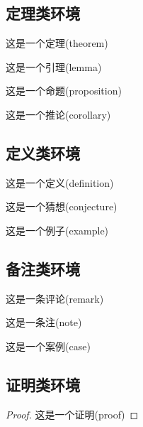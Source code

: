 \documentclass[cn,hazy,blue,11pt,device=normal,chinesefont=founder]{elegantnote}
\begin{document}
\subsection{定理类环境}

\begin{theorem}[名称]
  这是一个定理(theorem)
\end{theorem}

\begin{lemma}[名称]
  这是一个引理(lemma)
\end{lemma}

\begin{proposition}[名称]
  这是一个命题(proposition)
\end{proposition}

\begin{corollary}[名称]
  这是一个推论(corollary)
\end{corollary}

\subsection{定义类环境}

\begin{definition}[名称]
  这是一个定义(definition)
\end{definition}

\begin{conjecture}[名称]
  这是一个猜想(conjecture)
\end{conjecture}

\begin{example}[名称]
  这是一个例子(example)
\end{example}

\subsection{备注类环境}

\begin{remark}[名称]
  这是一条评论(remark)
\end{remark}

\begin{note}[名称]
  这是一条注(note)
\end{note}

\begin{case}[名称]
  这是一个案例(case)
\end{case}

\subsection{证明类环境}

\begin{proof}
  这是一个证明(proof)
\end{proof}
\end{document}
